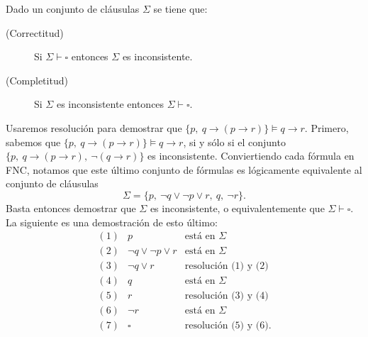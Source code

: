 \begin{teorema}
Dado un conjunto de cl\'ausulas $\Sigma$ se tiene que:
\begin{description}
\item[(Correctitud)] Si $\Sigma\vdash \square$ entonces $\Sigma$ es inconsistente.
\item[(Completitud)] Si $\Sigma$ es inconsistente entonces $\Sigma\vdash \square$. 
\end{description}
\end{teorema}

\begin{ejemplo}
Usaremos resoluci\'on para demostrar que 
$\{p,\ q\to(p\to r)\} \models q\to r$.
Primero, sabemos que $\{p,\ q\to(p\to r)\} \models q\to r$, si y s\'olo si el conjunto 
$\{p,\ q\to(p\to r),\ \neg(q\to r)\}$
es inconsistente.
Conviertiendo cada f\'ormula en FNC, notamos que este \'ultimo conjunto de f\'ormulas es l\'ogicamente equivalente al conjunto de cl\'ausulas
\[
\Sigma= \{p,\ \neg q\vee \neg p\vee r,\ q,\ \neg r\}.
\]
Basta entonces demostrar que $\Sigma$ es inconsistente, o equivalentemente que $\Sigma\vdash \square$.
La siguiente es una demostraci\'on de esto \'ultimo:
\[
\begin{array}{cll}
(1) & p & \text{est\'a en }\Sigma \\
(2) & \neg q\vee \neg p\vee r & \text{est\'a en }\Sigma\\
(3) & \neg q \vee r & \text{resoluci\'on (1) y (2)} \\
(4) & q & \text{est\'a en }\Sigma \\
(5) & r & \text{resoluci\'on (3) y (4)}\\
(6) & \neg r & \text{est\'a en }\Sigma \\
(7) & \square & \text{resoluci\'on (5) y (6).}
\end{array}
\]
\end{ejemplo}
